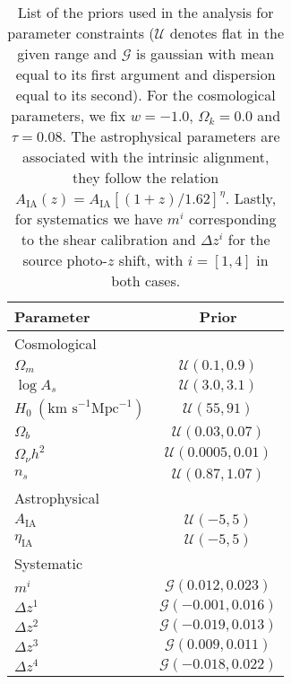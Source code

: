 \documentclass[twocolumn,nofootinbib]{\docclass}
\begin{document}
\begin{table}
	\begin{ruledtabular}
		\begin{tabular} { l c} 
			Parameter & Prior	\\ \hline
			Cosmological & \\ [1ex]
			$\Omega_m$ & $\mathcal{U}(0.1, 0.9)$ \\
			$\log A_s$ & $\mathcal{U}(3.0, 3.1)$ \\
			$H_0 \ (\text{km s}^{-1}\text{Mpc}^{-1})$ & $\mathcal{U}(55, 91)$\\
			$\Omega_b$ & $\mathcal{U}(0.03, 0.07)$ \\
			$\Omega_\nu h^2$ & $\mathcal{U}(0.0005, 0.01)$ \\
			$n_s$ & $\mathcal{U}(0.87, 1.07)$ \\ [1ex]
			\hline
			Astrophysical & \\ [1ex]
			$A_{\text{IA}}$	& $\mathcal{U}(-5, 5)$ \\
			$\eta_{\text{IA}}$& $\mathcal{U}(-5, 5)$ \\ [1ex]
			\hline
			Systematic      & \\ [1ex]
			$m^i$			& $\mathcal{G}(0.012, 0.023)$ \\
			$\Delta z^1$	& $\mathcal{G}(-0.001, 0.016)$ \\
			$\Delta z^2$	& $\mathcal{G}(-0.019, 0.013)$ \\
			$\Delta z^3$	& $\mathcal{G}(0.009, 0.011)$ \\
			$\Delta z^4$	& $\mathcal{G}(-0.018, 0.022)$ \\ [1ex]
		\end{tabular}
	\end{ruledtabular}
	\caption{List of the priors used in the analysis for parameter constraints ($\mathcal{U}$ denotes flat in the given range and $\mathcal{G}$ is gaussian with mean equal to its first argument and dispersion equal to its second). For the cosmological parameters, we fix $w = -1.0$, $\Omega_k =  0.0$ and $\tau =  0.08$. The astrophysical parameters are associated with the intrinsic alignment, they follow the relation $A_{\text{IA}}(z) = A_{\text{IA}}[(1+z)/1.62]^{\eta}$. Lastly, for systematics we have $m^i$ corresponding to the shear calibration and  $\Delta z^i$ for the source photo-$z$ shift, with $i = [1, 4]$ in both cases.}
	\label{tab:priors}
\end{table}
\end{document}
